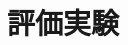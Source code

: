 \documentclass{deimj}
\begin{document}




\section{評価実験}
\label{sec:Evaluation Experiment}


\end{document}

